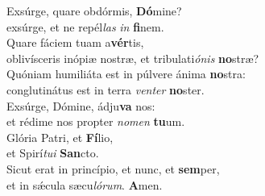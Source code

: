 \oddverse Exsúrge, quare obdórmis, \textbf{Dó}mine?~\*\\
\oddverse exsúrge, et ne repél\textit{las} \textit{in} \textbf{fi}nem.\\
\evenverse Quare fáciem tuam a\textbf{vér}tis,~\*\\
\evenverse oblivísceris inópiæ nostræ, et tribulati\textit{ó}\textit{nis} \textbf{no}stræ?\\
\oddverse Quóniam humiliáta est in púlvere ánima \textbf{no}stra:~\*\\
\oddverse conglutinátus est in terra \textit{ven}\textit{ter} \textbf{no}ster.\\
\evenverse Exsúrge, Dómine, ádju\textbf{va} nos:~\*\\
\evenverse et rédime nos propter \textit{no}\textit{men} \textbf{tu}um.\\
\oddverse Glória Patri, et \textbf{Fí}lio,~\*\\
\oddverse et Spirí\textit{tu}\textit{i} \textbf{San}cto.\\
\evenverse Sicut erat in princípio, et nunc, et \textbf{sem}per,~\*\\
\evenverse et in sǽcula sæcu\textit{ló}\textit{rum}. \textbf{A}men.\\
